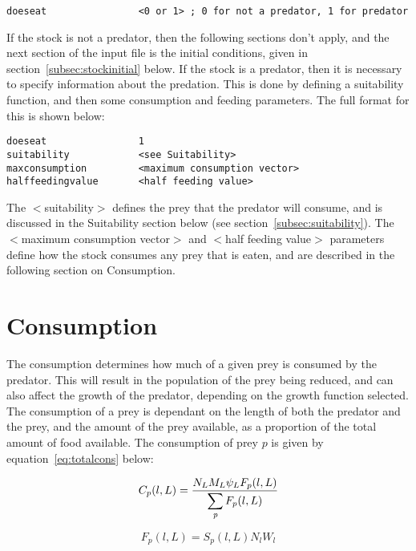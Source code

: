 \documentclass [a4paper, 10pt]{book}
\begin{document}
{\small\begin{verbatim}
doeseat                <0 or 1> ; 0 for not a predator, 1 for predator
\end{verbatim}}

If the stock is not a predator, then the following sections don't apply, and the next section of the input file is the initial conditions, given in section~\ref{subsec:stockinitial} below.  If the stock is a predator, then it is necessary to specify information about the predation.  This is done by defining a suitability function, and then some consumption and feeding parameters.  The full format for this is shown below:

{\small\begin{verbatim}
doeseat                1
suitability            <see Suitability>
maxconsumption         <maximum consumption vector>
halffeedingvalue       <half feeding value>
\end{verbatim}}

The $<$suitability$>$ defines the prey that the predator will consume, and is discussed in the Suitability section below (see section~\ref{subsec:suitability}).  The $<$maximum consumption vector$>$ and $<$half feeding value$>$ parameters define how the stock consumes any prey that is eaten, and are described in the following section on Consumption.

\section{Consumption}\label{subsec:consumption}
The consumption determines how much of a given prey is consumed by the predator.  This will result in the population of the prey being reduced, and can also affect the growth of the predator, depending on the growth function selected.  The consumption of a prey is dependant on the length of both the predator and the prey, and the amount of the prey available, as a proportion of the total amount of food available.  The consumption of prey $p$ is given by equation~\ref{eq:totalcons} below:

\begin{equation}\label{eq:totalcons}
C_{p}(l, L) = \frac{N_{L} M_{L} \psi_{L} F_{p}(l, L)}{\displaystyle \sum_{\it p} F_{p}(l, L)}
\end{equation}

\begin{equation}\label{eq:preycons}
F_{p}(l, L) = S_{p}(l, L) N_{l} W_{l}
\end{equation}
\end{document}
